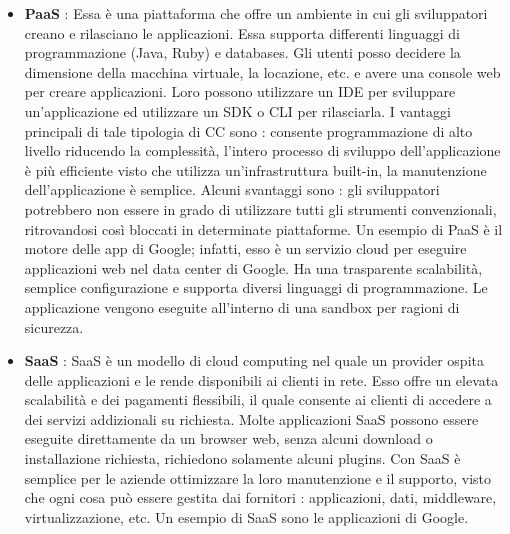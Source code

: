 \documentclass[12pt]{report}
\begin{document}
\begin{itemize}
\item \textbf{PaaS} : Essa è una piattaforma che offre un ambiente in cui gli sviluppatori creano e rilasciano le applicazioni. Essa supporta differenti linguaggi di programmazione (Java, Ruby) e databases. Gli utenti posso decidere la dimensione della macchina virtuale, la locazione, etc. e avere una console web per creare applicazioni. Loro possono utilizzare un IDE per sviluppare un'applicazione ed utilizzare un SDK o CLI per rilasciarla. I vantaggi principali di tale tipologia di CC sono : consente programmazione di alto livello riducendo la complessità, l'intero processo di sviluppo dell'applicazione è più efficiente visto che utilizza un'infrastruttura built-in, la manutenzione dell'applicazione è semplice. Alcuni svantaggi sono : gli sviluppatori potrebbero non essere in grado di utilizzare tutti gli strumenti convenzionali, ritrovandosi così bloccati in determinate piattaforme. Un esempio di PaaS è il motore delle app di Google; infatti, esso è un servizio cloud per eseguire applicazioni web nel data center di Google. Ha una trasparente scalabilità, semplice configurazione e supporta diversi linguaggi di programmazione. Le applicazione vengono eseguite all'interno di una sandbox per ragioni di sicurezza.
\item \textbf{SaaS} : SaaS è un modello di cloud computing nel quale un provider ospita delle applicazioni e le rende disponibili ai clienti in rete. Esso offre un elevata scalabilità e dei pagamenti flessibili, il quale consente ai clienti di accedere a dei servizi addizionali su richiesta. Molte applicazioni SaaS possono essere eseguite direttamente da un browser web, senza alcuni download o installazione richiesta, richiedono solamente alcuni plugins. Con SaaS è semplice per le aziende ottimizzare la loro manutenzione e il supporto, visto che ogni cosa può essere gestita dai fornitori : applicazioni, dati, middleware, virtualizzazione, etc. Un esempio di SaaS sono le applicazioni di Google.
\end{itemize}
\end{document}
